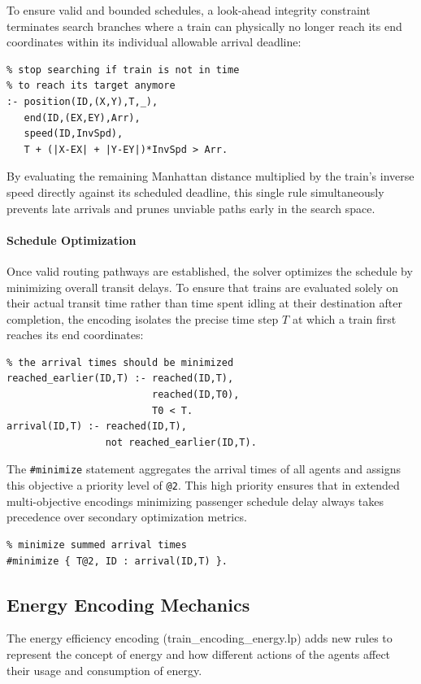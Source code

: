 \documentclass[12pt, a4paper]{llncs}
\begin{document}
To ensure valid and bounded schedules, a look-ahead integrity constraint terminates search branches where a train can physically no longer reach its end coordinates within its individual allowable arrival deadline:
\begin{verbatim}
% stop searching if train is not in time
% to reach its target anymore
:- position(ID,(X,Y),T,_),
   end(ID,(EX,EY),Arr),
   speed(ID,InvSpd),
   T + (|X-EX| + |Y-EY|)*InvSpd > Arr.
\end{verbatim}
By evaluating the remaining Manhattan distance multiplied by the train's inverse speed directly against its scheduled deadline, this single rule simultaneously prevents late arrivals and prunes unviable paths early in the search space.

\paragraph{Schedule Optimization}
Once valid routing pathways are established, the solver optimizes the schedule by minimizing overall transit delays. To ensure that trains are evaluated solely on their actual transit time rather than time spent idling at their destination after completion, the encoding isolates the precise time step $T$ at which a train first reaches its end coordinates:
\begin{verbatim}
% the arrival times should be minimized
reached_earlier(ID,T) :- reached(ID,T),
                         reached(ID,T0),
                         T0 < T.
arrival(ID,T) :- reached(ID,T),
                 not reached_earlier(ID,T).
\end{verbatim}

The \texttt{\#minimize} statement aggregates the arrival times of all agents and assigns this objective a priority level of \texttt{@2}. This high priority ensures that in extended multi-objective encodings minimizing passenger schedule delay always takes precedence over secondary optimization metrics.
\begin{verbatim}
% minimize summed arrival times
#minimize { T@2, ID : arrival(ID,T) }.
\end{verbatim}

\subsection{Energy Encoding Mechanics}
The energy efficiency encoding (train\_encoding\_energy.lp) adds new rules to represent the concept of energy and how different actions of the agents affect their usage and consumption of energy.
\end{document}
